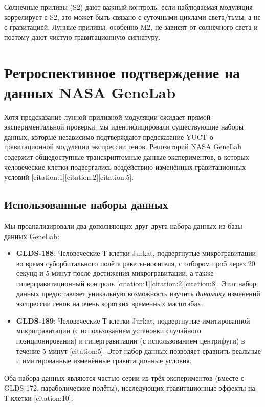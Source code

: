 \documentclass[12pt,a4paper]{article}
\theoremstyle{remark}
\begin{document}
	Солнечные приливы (S2) дают важный контроль: если наблюдаемая модуляция коррелирует с S2, это может быть связано с суточными циклами света/тьмы, а не с гравитацией. Лунные приливы, особенно M2, не зависят от солнечного света и поэтому дают чистую гравитационную сигнатуру.
	
	\section{Ретроспективное подтверждение на данных NASA GeneLab}
	\label{sec:genelab}
	
	Хотя предсказание лунной приливной модуляции ожидает прямой экспериментальной проверки, мы идентифицировали существующие наборы данных, которые независимо подтверждают предсказание YUCT о гравитационной модуляции экспрессии генов. Репозиторий NASA GeneLab содержит общедоступные транскриптомные данные экспериментов, в которых человеческие клетки подвергались воздействию изменённых гравитационных условий [citation:1][citation:2][citation:5].
	
	\subsection{Использованные наборы данных}
	
	Мы проанализировали два дополняющих друг друга набора данных из базы данных GeneLab:
	
	\begin{itemize}
		\item \textbf{GLDS-188}: Человеческие Т-клетки Jurkat, подвергнутые микрогравитации во время суборбитального полёта ракеты-носителя, с отбором проб через 20 секунд и 5 минут после достижения микрогравитации, а также гипергравитационный контроль [citation:1][citation:2][citation:8]. Этот набор данных предоставляет уникальную возможность изучить \textit{динамику} изменений экспрессии генов на очень коротких временных масштабах.
		
		\item \textbf{GLDS-189}: Человеческие Т-клетки Jurkat, подвергнутые имитированной микрогравитации (с использованием установки случайного позиционирования) и гипергравитации (с использованием центрифуги) в течение 5 минут [citation:5]. Этот набор данных позволяет сравнить реальные и имитированные изменённые гравитационные условия.
	\end{itemize}
	
	Оба набора данных являются частью серии из трёх экспериментов (вместе с GLDS-172, параболические полёты), исследующих гравитационные эффекты на Т-клетки [citation:10].
	
\end{document}
